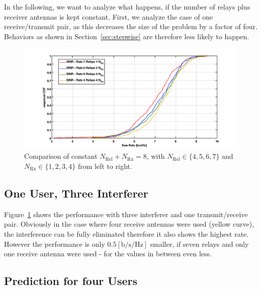 In the following, we want to analyze what happens, if the number of relays plus receiver antennas is kept constant.
First, we analyze the case of one receive/transmit pair, as this decreases the size of the problem by a factor of four.
Behaviors as shown in Section~\ref{sec:stepwise} are therefore less likely to happen.

\begin{figure}[h]
\centering
  \includegraphics[width=0.9\linewidth]{images/ConstNrelNrx8comparison_1Rx_onlySINR.png}
\caption{Comparison of constant $N_\text{Rel} + N_{\text{Rx}} = 8$, with $N_\text{Rel}\in\{4,5,6,7\}$ and $N_{\text{Rx}}\in\{1,2,3,4\}$ from left to right.}
\label{fig:1user_const}
\end{figure}
\subsection{One User, Three Interferer}
\label{sec:1user_const}
Figure~\ref{fig:1user_const} shows the performance with three interferer and one transmit/receive pair.
Obviously in the case where four receive antennas were used (yellow curve), the interference can be fully eliminated therefore it also shows the highest rate.
However the performance is only $0.5 \left[\text{b/s/Hz}\right]$ smaller, if seven relays and only one receive antenna were used - for the values in between even less.

\subsection{Prediction for four Users}
\label{sec:const_prediction}

